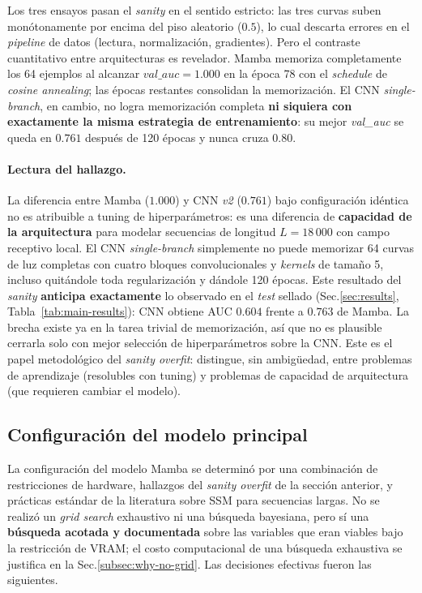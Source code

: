 \documentclass[11pt,a4paper]{article}
\begin{document}
Los tres ensayos pasan el \textit{sanity} en el sentido estricto: las
tres curvas suben monótonamente por encima del piso aleatorio ($0.5$),
lo cual descarta errores en el \textit{pipeline} de datos
(lectura, normalización, gradientes). Pero el contraste cuantitativo
entre arquitecturas es revelador. Mamba memoriza completamente los
64 ejemplos al alcanzar $\textit{val\_auc} = 1.000$ en la época 78
con el \textit{schedule} de \textit{cosine annealing}; las épocas
restantes consolidan la memorización. El CNN
\textit{single-branch}, en cambio, no logra memorización completa
\textbf{ni siquiera con exactamente la misma estrategia de
entrenamiento}: su mejor \textit{val\_auc} se queda en $0.761$
después de 120 épocas y nunca cruza $0.80$.

\paragraph{Lectura del hallazgo.}
La diferencia entre Mamba ($1.000$) y CNN \textit{v2} ($0.761$) bajo
configuración idéntica no es atribuible a tuning de hiperparámetros:
es una diferencia de \textbf{capacidad de la arquitectura} para
modelar secuencias de longitud $L = 18\,000$ con campo receptivo
local. El CNN \textit{single-branch} simplemente no puede memorizar
64 curvas de luz completas con cuatro bloques convolucionales y
\textit{kernels} de tamaño 5, incluso quitándole toda regularización
y dándole 120 épocas. Este resultado del \textit{sanity}
\textbf{anticipa exactamente} lo observado en el \textit{test} sellado
(Sec.\ref{sec:results}, Tabla~\ref{tab:main-results}): CNN obtiene
AUC $0.604$ frente a $0.763$ de Mamba. La brecha existe ya en la
tarea trivial de memorización, así que no es plausible cerrarla solo
con mejor selección de hiperparámetros sobre la CNN. Este es el
papel metodológico del \textit{sanity overfit}: distingue, sin
ambigüedad, entre problemas de aprendizaje (resolubles con tuning)
y problemas de capacidad de arquitectura (que requieren cambiar el
modelo).

\subsection{Configuración del modelo principal}
\label{subsec:config-search}

La configuración del modelo Mamba se determinó por una combinación de
restricciones de hardware, hallazgos del \textit{sanity overfit} de
la sección anterior, y prácticas estándar de la literatura sobre SSM
para secuencias largas. No se realizó un \textit{grid search}
exhaustivo ni una búsqueda bayesiana, pero sí una \textbf{búsqueda
acotada y documentada} sobre las variables que eran viables bajo la
restricción de VRAM; el costo computacional de una búsqueda
exhaustiva se justifica en la Sec.\ref{subsec:why-no-grid}. Las
decisiones efectivas fueron las siguientes.
\end{document}
